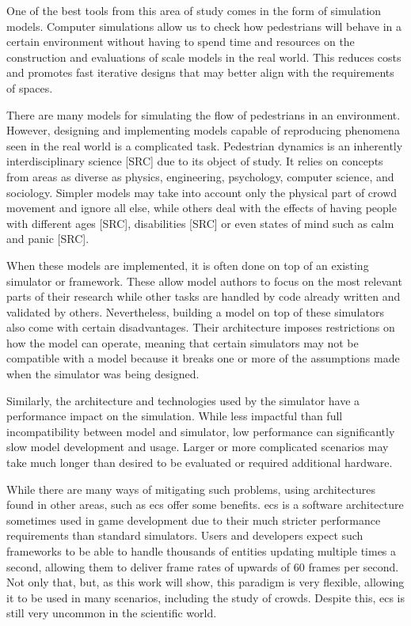 \documentclass[twoside, 11pt]{article}
\begin{document}
One of the best tools from this area of study comes in the form of simulation models. Computer simulations allow us to check how pedestrians will behave in a certain environment without having to spend time and resources on the construction and evaluations of scale models in the real world. This reduces costs and promotes fast iterative designs that may better align with the requirements of spaces.

There are many models for simulating the flow of pedestrians in an environment. However, designing and implementing models capable of reproducing phenomena seen in the real world is a complicated task. Pedestrian dynamics is an inherently interdisciplinary science [SRC] due to its object of study. It relies on concepts from areas as diverse as physics, engineering, psychology, computer science, and sociology. Simpler models may take into account only the physical part of crowd movement and ignore all else, while others deal with the effects of having people with different ages [SRC], disabilities [SRC] or even states of mind such as calm and panic [SRC].

When these models are implemented, it is often done on top of an existing simulator or framework. These allow model authors to focus on the most relevant parts of their research while other tasks are handled by code already written and validated by others. Nevertheless, building a model on top of these simulators also come with certain disadvantages. Their architecture imposes restrictions on how the model can operate, meaning that certain simulators may not be compatible with a model because it breaks one or more of the assumptions made when the simulator was being designed.

Similarly, the architecture and technologies used by the simulator have a performance impact on the simulation. While less impactful than full incompatibility between model and simulator, low performance can significantly slow model development and usage. Larger or more complicated scenarios may take much longer than desired to be evaluated or required additional hardware.

While there are many ways of mitigating such problems, using architectures found in other areas, such as \gls{ecs} offer some benefits. \gls{ecs} is a software architecture sometimes used in game development due to their much stricter performance requirements than standard simulators. Users and developers expect such frameworks to be able to handle thousands of entities updating multiple times a second, allowing them to deliver frame rates of upwards of 60 frames per second. Not only that, but, as this work will show, this paradigm is very flexible, allowing it to be used in many scenarios, including the study of crowds. Despite this, \gls{ecs} is still very uncommon in the scientific world.
\end{document}
